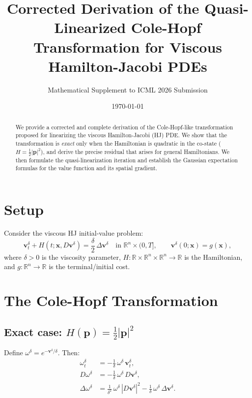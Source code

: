 \documentclass[11pt]{article}
\title{Corrected Derivation of the Quasi-Linearized Cole-Hopf\\
Transformation for Viscous Hamilton-Jacobi PDEs}
\author{Mathematical Supplement to ICML 2026 Submission}
\date{\today}
\newcommand{\R}{\mathbb{R}}
\newcommand{\bx}{\bm{x}}
\newcommand{\bv}{\bm{v}}
\newcommand{\bp}{\bm{p}}
\begin{document}
\maketitle

\begin{abstract}
We provide a corrected and complete derivation of the Cole-Hopf-like
transformation proposed for linearizing the viscous Hamilton-Jacobi (HJ) PDE.
We show that the transformation is \emph{exact} only when the Hamiltonian
is quadratic in the co-state ($H = \tfrac{1}{2}|\bp|^2$), and derive the
precise residual that arises for general Hamiltonians.  We then formulate
the quasi-linearization iteration and establish the Gaussian expectation
formulas for the value function and its spatial gradient.
\end{abstract}

\section{Setup}

Consider the viscous HJ initial-value problem:
\begin{equation}\label{eq:hjvisc}
  \bv_t^\delta + H(t;\bx, D\bv^\delta) = \frac{\delta}{2}\,\Delta \bv^\delta
  \quad\text{in } \R^n\times(0,T],
  \qquad
  \bv^\delta(0;\bx) = g(\bx),
\end{equation}
where $\delta > 0$ is the viscosity parameter, $H:\R\times\R^n\times\R^n\to\R$
is the Hamiltonian, and $g:\R^n\to\R$ is the terminal/initial cost.

\section{The Cole-Hopf Transformation}

\subsection{\texorpdfstring{Exact case: $H(\bp) = \tfrac{1}{2}|\bp|^2$}{Exact case: H(p) = (1/2)|p|²}}

Define $\omega^\delta = e^{-\bv^\delta/\delta}$.  Then:
\begin{align}
  \omega_t^\delta &= -\frac{1}{\delta}\,\omega^\delta\, \bv_t^\delta, \\
  D\omega^\delta &= -\frac{1}{\delta}\,\omega^\delta\, D\bv^\delta, \\
  \Delta\omega^\delta &= \frac{1}{\delta^2}\,\omega^\delta\,|D\bv^\delta|^2
    - \frac{1}{\delta}\,\omega^\delta\,\Delta\bv^\delta.
\end{align}
\end{document}
